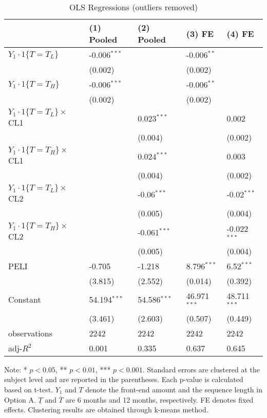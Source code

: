 \documentclass[12pt]{article}
\begin{document}
\begin{table}
    \caption{OLS Regressions (outliers removed)}
    \vspace*{12pt}
    \centering

      \begin{tabular}{lllll}
\hline
 & (1) Pooled & (2) Pooled & (3) FE & (4) FE \\
\hline
$Y_1\cdot1\{T=T_L\}$ & -0.006$^{***}$ &  & -0.006$^{**}$ &  \\
 & (0.002) &  & (0.002) &  \\
$Y_1\cdot1\{T=T_H\}$ & -0.006$^{***}$ &  & -0.006$^{**}$ &  \\
 & (0.002) &  & (0.002) &  \\
$Y_1\cdot1\{T=T_L\}\times$CL1 &  & 0.023$^{***}$ &  & 0.002 \\
 &  & (0.004) &  & (0.002) \\
$Y_1\cdot1\{T=T_H\}\times$CL1 &  & 0.024$^{***}$ &  & 0.003 \\
 &  & (0.004) &  & (0.002) \\
$Y_1\cdot1\{T=T_L\}\times$CL2 &  & -0.06$^{***}$ &  & -0.02$^{***}$ \\
 &  & (0.005) &  & (0.004) \\
$Y_1\cdot1\{T=T_H\}\times$CL2 &  & -0.061$^{***}$ &  & -0.022$^{***}$ \\
 &  & (0.005) &  & (0.004) \\
PELI & -0.705 & -1.218 & 8.796$^{***}$ & 6.52$^{***}$ \\
 & (3.815) & (2.552) & (0.014) & (0.392) \\
Constant & 54.194$^{***}$ & 54.586$^{***}$ & 46.971$^{***}$ & 48.711$^{***}$ \\
 & (3.461) & (2.603) & (0.507) & (0.449) \\\hline

observations & 2242 & 2242 & 2242 & 2242 \\
adj-$R^2$ & 0.001 & 0.335 & 0.637 & 0.645 \\
\hline
\end{tabular}

    \vspace*{4pt}
    \centering
    \begin{minipage}{0.85\textwidth}
    {\par\footnotesize Note: * $p<0.05$, ** $p<0.01$, *** $p<0.001$. Standard errors are clustered at the subject level and are reported in the parentheses. Each p-value is calculated based on t-test. $Y_1$ and $T$ denote the front-end amount and the sequence length in Option A. $\underline{T}$ and $\bar{T}$ are 6 months and 12 months, respectively. FE denotes fixed effects. Clustering results are obtained through k-means method.}
    \end{minipage}
    \label{tab:seq_value_ols}
\end{table}
\end{document}
